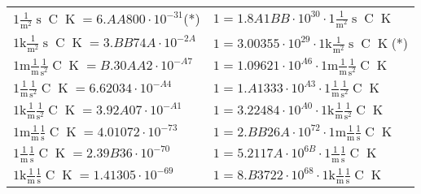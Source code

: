 \begin{center}
\begin{longtable}{l l}
{\color{black}$1 \bm{\mathrm{ }}\frac1{\operatorname{m}^2}{\operatorname{s}}{\operatorname{C}}{\operatorname{K}} = 6.AA800\cdot10^{-31} $}\quad(*) & {\color{black}$ 1 = 1.8A1BB\cdot10^{30} \cdot 1 \bm{\mathrm{ }}\frac1{\operatorname{m}^2}{\operatorname{s}}{\operatorname{C}}{\operatorname{K}}$}  \\
{\color{gray}$1 \bm{\mathrm{ k}}\frac1{\operatorname{m}^2}{\operatorname{s}}{\operatorname{C}}{\operatorname{K}} = 3.BB74A\cdot10^{-2A} $}   & {\color{gray}$ 1 = 3.00355\cdot10^{29} \cdot 1 \bm{\mathrm{ k}}\frac1{\operatorname{m}^2}{\operatorname{s}}{\operatorname{C}}{\operatorname{K}}$}\quad(*)\\
{\color{gray}$1 \bm{\mathrm{ m}}\frac1{\operatorname{m}}\frac1{\operatorname{s}^2}{\operatorname{C}}{\operatorname{K}} = B.30AA2\cdot10^{-A7} $}   & {\color{gray}$ 1 = 1.09621\cdot10^{A6} \cdot 1 \bm{\mathrm{ m}}\frac1{\operatorname{m}}\frac1{\operatorname{s}^2}{\operatorname{C}}{\operatorname{K}}$}  \\
{\color{black}$1 \bm{\mathrm{ }}\frac1{\operatorname{m}}\frac1{\operatorname{s}^2}{\operatorname{C}}{\operatorname{K}} = 6.62034\cdot10^{-A4} $}   & {\color{black}$ 1 = 1.A1333\cdot10^{A3} \cdot 1 \bm{\mathrm{ }}\frac1{\operatorname{m}}\frac1{\operatorname{s}^2}{\operatorname{C}}{\operatorname{K}}$}  \\
{\color{gray}$1 \bm{\mathrm{ k}}\frac1{\operatorname{m}}\frac1{\operatorname{s}^2}{\operatorname{C}}{\operatorname{K}} = 3.92A07\cdot10^{-A1} $}   & {\color{gray}$ 1 = 3.22484\cdot10^{A0} \cdot 1 \bm{\mathrm{ k}}\frac1{\operatorname{m}}\frac1{\operatorname{s}^2}{\operatorname{C}}{\operatorname{K}}$}  \\
{\color{gray}$1 \bm{\mathrm{ m}}\frac1{\operatorname{m}}\frac1{\operatorname{s}}{\operatorname{C}}{\operatorname{K}} = 4.01072\cdot10^{-73} $}   & {\color{gray}$ 1 = 2.BB26A\cdot10^{72} \cdot 1 \bm{\mathrm{ m}}\frac1{\operatorname{m}}\frac1{\operatorname{s}}{\operatorname{C}}{\operatorname{K}}$}  \\
{\color{black}$1 \bm{\mathrm{ }}\frac1{\operatorname{m}}\frac1{\operatorname{s}}{\operatorname{C}}{\operatorname{K}} = 2.39B36\cdot10^{-70} $}   & {\color{black}$ 1 = 5.2117A\cdot10^{6B} \cdot 1 \bm{\mathrm{ }}\frac1{\operatorname{m}}\frac1{\operatorname{s}}{\operatorname{C}}{\operatorname{K}}$}  \\
{\color{gray}$1 \bm{\mathrm{ k}}\frac1{\operatorname{m}}\frac1{\operatorname{s}}{\operatorname{C}}{\operatorname{K}} = 1.41305\cdot10^{-69} $}   & {\color{gray}$ 1 = 8.B3722\cdot10^{68} \cdot 1 \bm{\mathrm{ k}}\frac1{\operatorname{m}}\frac1{\operatorname{s}}{\operatorname{C}}{\operatorname{K}}$}  \\

\end{longtable}
\end{center}
